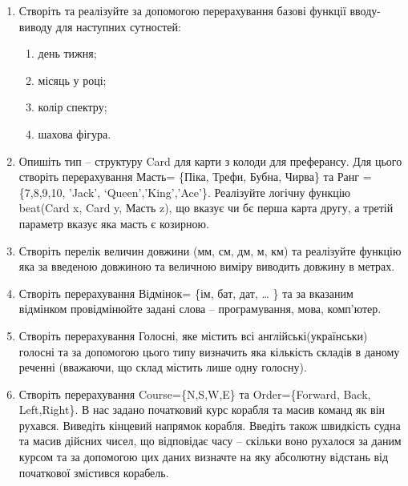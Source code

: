 \documentclass[]{article}
\makeatletter
\newcommand{\xslalph}[1]{\expandafter\@xslalph\csname c@#1\endcsname}
\newcommand{\@xslalph}[1]{%
    \ifcase#1\or а\or б\or в\or г\or д\or e\or є\or ж\or з\or i%
    \or й\or к\or л\or м\or н\or о\or п\or р\or с\or т%
    \or у\or ф\or х\or ц\or ч\or ш\or ю\or я\or аа\or бб\or вв %
    \else\@ctrerr\fi%
}
\makeatother
\begin{document}
\begin{enumerate}
\item
Створіть та реалізуйте за допомогою перерахування базові функції
вводу-виводу для наступних сутностей:
\begin{enumerate}[label=\xslalph*)]
\item
день тижня;
\item
місяць у році;
\item
колір спектру;
\item
шахова фігура.
\end{enumerate}
\item
Опишіть тип -- структуру Card для карти з колоди для преферансу. Для
цього створіть перерахування Масть= \{Піка, Трефи, Бубна, Чирва\} та
Ранг =\{7,8,9,10, 'Jack', `Queen','King','Ace'\}. Реалізуйте логічну
функцію beat(Card x, Card y, Масть z), що вказує чи бє перша карта
другу, а третій параметр вказує яка масть є козирною.
\item
Створіть перелік величин довжини
(мм, см, дм, м, км) та реалізуйте функцію яка за введеною довжиною та
величною виміру виводить довжину в метрах.
\item
Створіть перерахування Відмінок= \{ім, бат, дат, \ldots{} \} та за
вказаним відмінком провідмінюйте задані слова -- програмування, мова,
комп'ютер.
\item
Створіть перерахування Голосні, яке містить всі англійські(українськи)
голосні та за допомогою цього типу визначить яка кількість складів в
даному реченні (вважаючи, що склад містить лише одну голосну).
\item
Створіть перерахування Course=\{N,S,W,E\} та Order=\{Forward, Back,
Left,Right\}. В нас задано початковий курс корабля та масив команд як
він рухався. Виведіть кінцевий напрямок корабля. Введіть також швидкість
судна та масив дійсних чисел, що відповідає часу -- скільки воно
рухалося за даним курсом та за допомогою цих даних визначте на яку
абсолютну відстань від початкової змістився корабель.
\end{enumerate}
\end{document}
